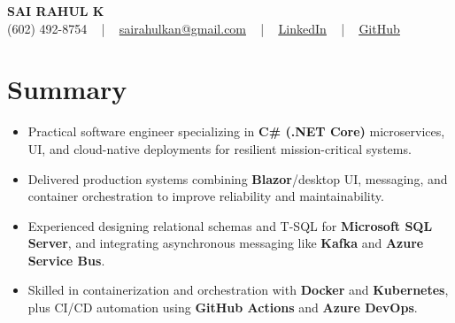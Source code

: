 \documentclass[letterpaper,11pt]{article}
\newcommand{\resumeItem}[1]{
  \item\footnotesize{
    {#1 \vspace{-2pt}}
  }
}
\newcommand{\resumeItemListStart}{\begin{itemize}[leftmargin=*]}
\newcommand{\resumeItemListEnd}{\end{itemize}\vspace{-5pt}}
\begin{document}
\begin{center}
    {\fontsize{14pt}{12pt}\selectfont \textbf{\MakeUppercase{Sai Rahul K}}}\\ \vspace{2pt}
    \fontsize{10pt}{12pt}\selectfont (602) 492-8754 ~ | ~ \href{mailto:sairahulkan@gmail.com}{sairahulkan@gmail.com} ~ | ~
    \href{https://www.linkedin.com/in/rq123/}{\color{blue}\underline{LinkedIn}} ~ | ~
    \href{https://github.com/kanrahuldo}{\color{blue}\underline{GitHub}}~
    \vspace{-8pt}
\end{center}

\section{Summary}
\fontsize{9pt}{10pt}\selectfont
\resumeItemListStart
    \resumeItem{Practical software engineer specializing in \textbf{C\# (.NET Core)} microservices, UI, and cloud-native deployments for resilient mission-critical systems.}
    \resumeItem{Delivered production systems combining \textbf{Blazor}/desktop UI, messaging, and container orchestration to improve reliability and maintainability.}
    \resumeItem{Experienced designing relational schemas and T-SQL for \textbf{Microsoft SQL Server}, and integrating asynchronous messaging like \textbf{Kafka} and \textbf{Azure Service Bus}.}
    \resumeItem{Skilled in containerization and orchestration with \textbf{Docker} and \textbf{Kubernetes}, plus CI/CD automation using \textbf{GitHub Actions} and \textbf{Azure DevOps}.}
\resumeItemListEnd
\vspace{-6pt}
\end{document}
